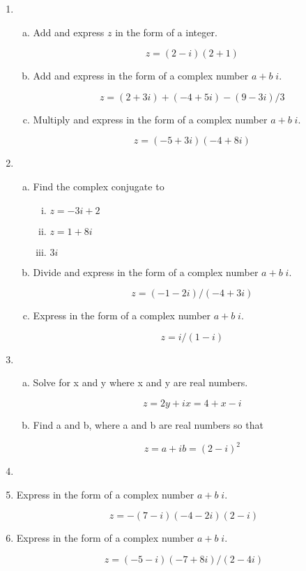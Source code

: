 

\begin{enumerate}

\item 
\begin{enumerate}[(a)]

\item Add and express $z$ in the form of a integer. 

$$z =(2-i)(2+1)$$

\item Add and express in the form of a complex number $a + b\; i$. 

$$z =(2 + 3i) + (-4 + 5i) - (9 - 3i) / 3 $$

\item Multiply and express in the form of a complex number $a + b\; i$. 

$$z =(-5 + 3i)(- 4 + 8i) $$
\end{enumerate}
\item 
\begin{enumerate}[(a)]
\item Find the complex conjugate to 
\begin{enumerate}[(i)]
    \item $z = - 3 i + 2$
\item 
$z =1 + 8i $
\item $ 3i$
\end{enumerate}

\item Divide and express in the form of a complex number $a + b\; i$. 

$$z =(-1 - 2i) / (- 4 + 3i) $$


\item Express in the form of a complex number $a + b\; i$. 

$$z = i / (1 - i) $$
\end{enumerate}
\item 
\begin{enumerate}[(a)]
\item Solve for x and y where x and y are real numbers. 

$$z =2 y + i x = 4 + x - i $$
\item Find a and b, where a and b are real numbers so that 

$$z =a + i b = (2 - i)^2$$

\end{enumerate}
\item 

\item Express in the form of a complex number $a + b\; i$. 

$$z =- (7 - i)(- 4 - 2i)(2 - i) $$

\item Express in the form of a complex number $a + b\; i$. 

$$z =(-5 - i)(- 7 + 8i) / (2 - 4i) $$
\end{enumerate}

